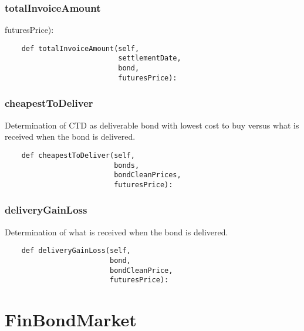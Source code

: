 \documentclass[twoside,11pt]{book}
\begin{document}
\subsubsection*{{\bf totalInvoiceAmount}}
futuresPrice): 

\begin{lstlisting}
    def totalInvoiceAmount(self,
                           settlementDate,
                           bond,
                           futuresPrice):
\end{lstlisting}

\subsubsection*{{\bf cheapestToDeliver}}
Determination of CTD as deliverable bond with lowest cost to buy versus what is received when the bond is delivered.  

\begin{lstlisting}
    def cheapestToDeliver(self,
                          bonds,
                          bondCleanPrices,
                          futuresPrice):
\end{lstlisting}

\subsubsection*{{\bf deliveryGainLoss}}
Determination of what is received when the bond is delivered.  

\begin{lstlisting}
    def deliveryGainLoss(self,
                         bond,
                         bondCleanPrice,
                         futuresPrice):
\end{lstlisting}

\newpage
\section{FinBondMarket}
\end{document}
